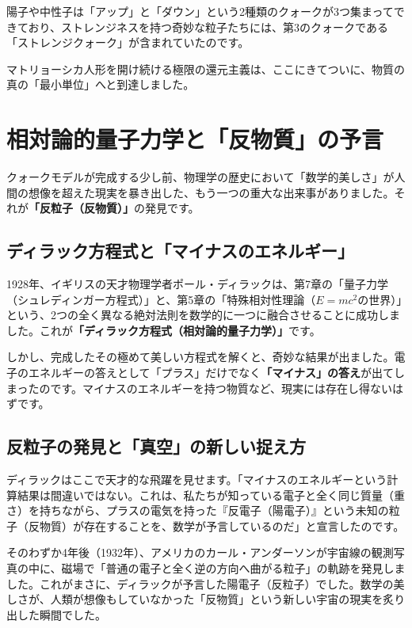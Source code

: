 陽子や中性子は「アップ」と「ダウン」という2種類のクォークが3つ集まってできており、ストレンジネスを持つ奇妙な粒子たちには、第3のクォークである「ストレンジクォーク」が含まれていたのです。

マトリョーシカ人形を開け続ける極限の還元主義は、ここにきてついに、物質の真の「最小単位」へと到達しました。

\section{相対論的量子力学と「反物質」の予言}

クォークモデルが完成する少し前、物理学の歴史において「数学的美しさ」が人間の想像を超えた現実を暴き出した、もう一つの重大な出来事がありました。それが\textbf{「反粒子（反物質）」}の発見です。

\subsection{ディラック方程式と「マイナスのエネルギー」}

1928年、イギリスの天才物理学者ポール・ディラックは、第7章の「量子力学（シュレディンガー方程式）」と、第5章の「特殊相対性理論（\(E=mc^2\)の世界）」という、2つの全く異なる絶対法則を数学的に一つに融合させることに成功しました。これが\textbf{「ディラック方程式（相対論的量子力学）」}です。

しかし、完成したその極めて美しい方程式を解くと、奇妙な結果が出ました。電子のエネルギーの答えとして「プラス」だけでなく\textbf{「マイナス」の答え}が出てしまったのです。マイナスのエネルギーを持つ物質など、現実には存在し得ないはずです。

\subsection{反粒子の発見と「真空」の新しい捉え方}

ディラックはここで天才的な飛躍を見せます。「マイナスのエネルギーという計算結果は間違いではない。これは、私たちが知っている電子と全く同じ質量（重さ）を持ちながら、プラスの電気を持った『反電子（陽電子）』という未知の粒子（反物質）が存在することを、数学が予言しているのだ」と宣言したのです。

そのわずか4年後（1932年）、アメリカのカール・アンダーソンが宇宙線の観測写真の中に、磁場で「普通の電子と全く逆の方向へ曲がる粒子」の軌跡を発見しました。これがまさに、ディラックが予言した陽電子（反粒子）でした。数学の美しさが、人類が想像もしていなかった「反物質」という新しい宇宙の現実を炙り出した瞬間でした。

